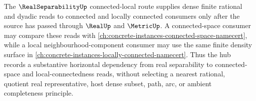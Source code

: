 The $\RealSeparabilityUp$ connected-local route supplies dense finite rational and dyadic reads to connected and locally connected consumers only after the source has passed through $\RealUp$ and $\MetricUp$. A connected-space consumer may compare these reads with \autoref{ch:concrete-instances-connected-space-namecert}, while a local neighbourhood-component consumer may use the same finite density surface in \autoref{ch:concrete-instances-locally-connected-namecert}. Thus the hub records a substantive horizontal dependency from real separability to connected-space and local-connectedness reads, without selecting a nearest rational, quotient real representative, host dense subset, path, arc, or ambient completeness principle.
